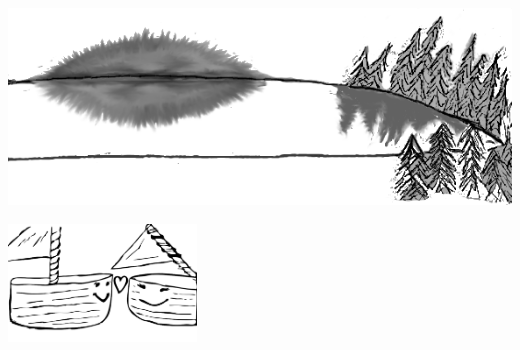 \sclearpage

\begin{intersong}
	\begin{center}
		\vspace{20mm}
		\includegraphics[width=1\textwidth]{../bilder/fardigabilder/CamillasFardigaBilder/Oppnalandskap3.png} 
	\end{center}
\end{intersong}
\sclearpage



\begin{intersong}
	\begin{center}
		\vspace{20mm}
		\includegraphics[width=5cm]{../bilder/fardigabilder/Batlat.png} 
	\end{center}
\end{intersong}
\sclearpage

\sclearpage